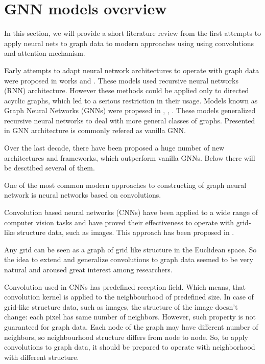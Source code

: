 \section{GNN models overview}
\label{sec:models}



In this section, we will provide a short literature review from the first attempts to
apply neural nets to graph data to modern approaches using using convolutions and attention mechanism.



Early attempts to adapt neural network architectures to operate with graph data 
were proposed in works \cite{FirstGNN1} and  \cite{FirstGNN2}. These models 
used recursive neural networks (RNN) architecture. However these methods could be applied
only to directed acyclic graphs, which led to a serious restriction in their usage.
Models known as Graph Neural Networks (GNNs) were propesed in  \cite{GNNlist1}, \cite{GNNlist2}, \cite{GNN}.
These models generalized recursive neural networks to deal with more general classes of graphs.
Presented in \cite{GNN} GNN architecture is commonly refered as vanilla GNN.





Over the last decade, there have been proposed a huge number of new architectures and frameworks, which 
outperform vanilla GNNs. Below there will be desctibed several of them. 



One of the most common modern approaches to constructing of graph neural network is
neural networks based on convolutions.

Convolution based neural networks (CNNs) have been applied to a wide range of computer
vision tasks and have proved their effectiveness to operate with grid-like structure data, such as images.
This approach has been proposed in \cite{CNN}.

Any grid can be seen as a graph of grid like structure in the Euclidean space. So the idea to extend and generalize
convolutions to graph data seemed to be very natural and aroused great interest among researchers.


Convolution used in CNNs has predefined reception field. Which means, that convolution kernel is 
applied to the neighbourhood of predefined size. In case of grid-like structure data, such as
images, the structure of the image doesn't change: each pixel has same number of neighbors. 
However, such property is not guaranteed for graph data. Each node of the graph may have 
different number of neighbors, so neighbourhood structure differs from node to node. So,
to apply convolutions to graph data, it should be prepared to operate with neighborhood 
with different structure.

